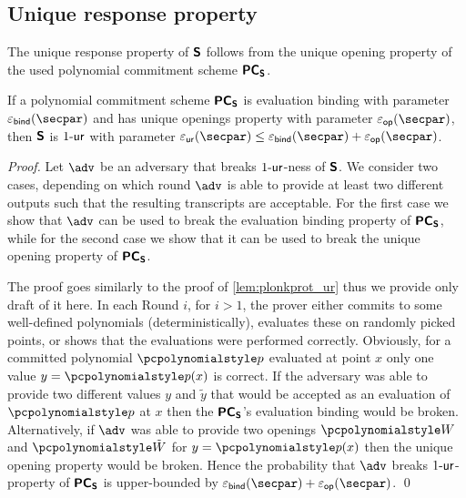 \documentclass[runningheads,11pt]{llncs}
\begin{document}
\subsection{Unique response property}
The unique response property of $\bm{\mathsf{S}}$ follows from the unique opening
property of the used polynomial commitment scheme $\bm{\mathsf{PC}}_{\bm{\mathsf{S}}}$.
\begin{lemma}
\label{lem:sonicprot_ur}
If a polynomial commitment scheme $\bm{\mathsf{PC}}_{\bm{\mathsf{S}}}$ is evaluation binding with
parameter $\epsbind(\secpar)$ and has unique openings property with parameter
$\epsop(\secpar)$, then $\bm{\mathsf{S}}$ is ${1\text{-}\mathsf{ur}}$ with parameter $\epsur(\secpar) \leq
\epsbind(\secpar) + \epsop(\secpar)$.  
\end{lemma}
\begin{proof}
  Let $\adv$ be an adversary that breaks ${1\text{-}\mathsf{ur}}$-ness of $\bm{\mathsf{S}}$.  We
  consider two cases, depending on which round $\adv$ is able to provide at
  least two different outputs such that the resulting transcripts are
  acceptable.  For the first case we show that $\adv$ can be used to break the
  evaluation binding property of $\bm{\mathsf{PC}}_{\bm{\mathsf{S}}}$, while for the second case we show
  that it can be used to break the unique opening property of $\bm{\mathsf{PC}}_{\bm{\mathsf{S}}}$.

  The proof goes similarly to the proof of \cref{lem:plonkprot_ur} thus we
  provide only draft of it here.  In each Round $i$, for $i > 1$, the prover
  either commits to some well-defined polynomials (deterministically), evaluates
  these on randomly picked points, or shows that the evaluations were performed
  correctly.  Obviously, for a committed polynomial $\p{p}$ evaluated at point
  $x$ only one value $y = \p{p}(x)$ is correct. If the adversary was able to
  provide two different values $y$ and $\tilde{y}$ that would be accepted as an
  evaluation of $\p{p}$ at $x$ then the $\bm{\mathsf{PC}}_{\bm{\mathsf{S}}}$'s evaluation binding would be
  broken.  Alternatively, if $\adv$ was able to provide two openings $\p{W}$ and
  $\p{\tilde{W}}$ for $y = \p{p}(x)$ then the unique opening property would be
  broken.
%
Hence the probability that $\adv$ breaks ${1\text{-}\mathsf{ur}}$-property of $\bm{\mathsf{PC}}_{\bm{\mathsf{S}}}$ is
upper-bounded by $\epsbind(\secpar) + \epsop(\secpar)$. 
\qed

\end{proof}
\end{document}
